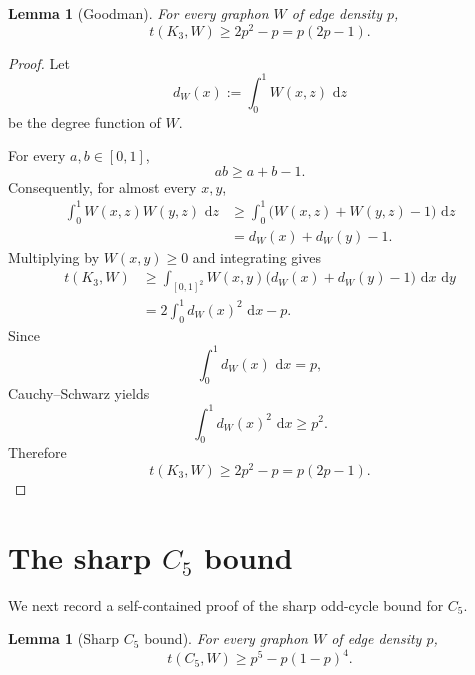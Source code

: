 \documentclass[11pt]{article}
\newtheorem{lemma}[theorem]{Lemma}
\newcommand{\dd}{\,\mathrm{d}}
\begin{document}
\begin{lemma}[Goodman]\label{lem:goodman}
For every graphon \(W\) of edge density \(p\),
\[
t(K_3,W)\ge 2p^2-p=p(2p-1).
\]
\end{lemma}

\begin{proof}
Let
\[
d_W(x):=\int_0^1W(x,z)\,\dd z
\]
be the degree function of \(W\).

For every \(a,b\in[0,1]\),
\[
ab\ge a+b-1.
\]
Consequently, for almost every \(x,y\),
\[
\begin{aligned}
\int_0^1 W(x,z)W(y,z)\,\dd z
&\ge
\int_0^1
\bigl(W(x,z)+W(y,z)-1\bigr)\,\dd z\\
&=
d_W(x)+d_W(y)-1.
\end{aligned}
\]
Multiplying by \(W(x,y)\ge0\) and integrating gives
\[
\begin{aligned}
t(K_3,W)
&\ge
\int_{[0,1]^2}
W(x,y)
\bigl(d_W(x)+d_W(y)-1\bigr)
\,\dd x\,\dd y\\
&=
2\int_0^1d_W(x)^2\,\dd x-p.
\end{aligned}
\]
Since
\[
\int_0^1d_W(x)\,\dd x=p,
\]
Cauchy--Schwarz yields
\[
\int_0^1d_W(x)^2\,\dd x\ge p^2.
\]
Therefore
\[
t(K_3,W)\ge 2p^2-p=p(2p-1).
\]
\end{proof}

\section{The sharp \(C_5\) bound}

We next record a self-contained proof of the sharp odd-cycle bound for
\(C_5\).

\begin{lemma}[Sharp \(C_5\) bound]\label{lem:c5}
For every graphon \(W\) of edge density \(p\),
\[
t(C_5,W)
\ge
p^5-p(1-p)^4.
\]
\end{lemma}
\end{document}
